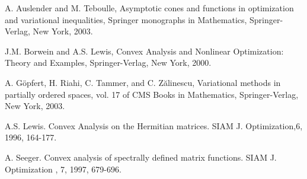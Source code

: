 \documentclass[a4paper,11pt, oneside]{book}
\theoremstyle{definition}
\begin{document}
\begin{thebibliography}{9}
  A. Auslender and M. Teboulle, Asymptotic cones and functions in optimization and variational inequalities, Springer monographs in Mathematics, Springer-Verlag, New York, 2003.

  J.M. Borwein and A.S. Lewis, Convex Analysis and Nonlinear Optimization: Theory and Examples, Springer-Verlag, New York, 2000.

  A. G\"{o}pfert, H. Riahi, C. Tammer, and C. Z\u{a}linescu, Variational methods in partially ordered spaces, vol. 17 of CMS Books in Mathematics, Springer-Verlag, New York, 2003.

  A.S. Lewis. Convex Analysis on the Hermitian matrices. SIAM J. Optimization,6, 1996, 164-177.

  A. Seeger. Convex analysis of spectrally defined matrix functions. SIAM J. Optimization , 7, 1997, 679-696.

  \end{thebibliography}
\end{document}
